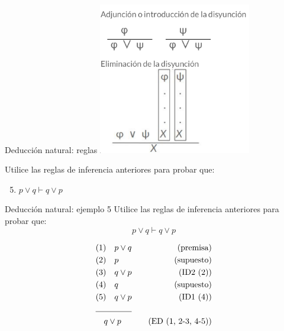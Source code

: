 \documentclass{beamer}
\begin{document}
\begin{frame}{Deducción natural: reglas}
  \centering
  \includegraphics[width=0.5\textwidth]{images/reglas_inferencia.png}

  Utilice las reglas de inferencia anteriores para probar que:
  \begin{enumerate}
    \setcounter{enumi}{4}
    \item $p \vee q \vdash q \vee p$
  \end{enumerate}

\end{frame}


\begin{frame}{Deducción natural: ejemplo 5}
  Utilice las reglas de inferencia anteriores para probar que:
  $$p \vee q \vdash q \vee p$$

  \begin{align*}
    &(1) \quad p \vee q  & \quad (\text{premisa}) \\
    &(2) \quad p  & \quad (\text{supuesto}) \\
    &(3) \quad q \vee p  & \quad (\text{ID2 (2)}) \\
    &(4) \quad q  & \quad (\text{supuesto}) \\
    &(5) \quad q \vee p  & \quad (\text{ID1 (4)}) \\
    \cline{1-2}
    & \quad q \vee p & \quad (\text{ED (1, 2-3, 4-5)})
  \end{align*}

\end{frame}
\end{document}
